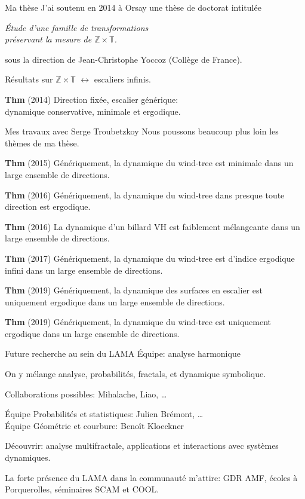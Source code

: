 \documentclass[
  french,
  ignorenonframetext,
]{beamer}
\begin{document}
\begin{frame}{Ma thèse}
\protect\hypertarget{ma-thuxe8se}{}
J'ai soutenu en 2014 à Orsay une thèse de doctorat intitulée

\emph{Étude d'une famille de transformations\\
préservant la mesure de \(ℤ × 𝕋\).}

sous la direction de Jean-Christophe Yoccoz (Collège de France).

Résultats sur \(ℤ × 𝕋\) \(\longleftrightarrow\) escaliers infinis.

\textbf{Thm} (2014) Direction fixée, escalier générique:\\
dynamique conservative, minimale et ergodique.
\end{frame}

\begin{frame}{Mes travaux avec Serge Troubetzkoy}
\protect\hypertarget{mes-travaux-avec-serge-troubetzkoy}{}
Nous poussons beaucoup plus loin les thèmes de ma thèse.

\textbf{Thm} (2015) Génériquement, la dynamique du wind-tree est
minimale dans un large ensemble de directions.

\textbf{Thm} (2016) Génériquement, la dynamique du wind-tree dans
presque toute direction est ergodique.

\textbf{Thm} (2016) La dynamique d'un billard VH est faiblement
mélangeante dans un large ensemble de directions.

\textbf{Thm} (2017) Génériquement, la dynamique du wind-tree est
d'indice ergodique infini dans un large ensemble de directions.

\textbf{Thm} (2019) Génériquement, la dynamique des surfaces en escalier
est uniquement ergodique dans un large ensemble de directions.

\textbf{Thm} (2019) Génériquement, la dynamique du wind-tree est
uniquement ergodique dans un large ensemble de directions.
\end{frame}

\begin{frame}{Future recherche au sein du LAMA}
\protect\hypertarget{future-recherche-au-sein-du-lama}{}
Équipe: analyse harmonique

On y mélange analyse, probabilités, fractals, et dynamique symbolique.

Collaborations possibles: Mihalache, Liao, \ldots{}

Équipe Probabilités et statistiques: Julien Brémont, \ldots{}\\
Équipe Géométrie et courbure: Benoît Kloeckner

Découvrir: analyse multifractale, applications et interactions avec
systèmes dynamiques.

La forte présence du LAMA dans la communauté m'attire: GDR AMF, écoles à
Porquerolles, séminaires SCAM et COOL.
\end{frame}
\end{document}
